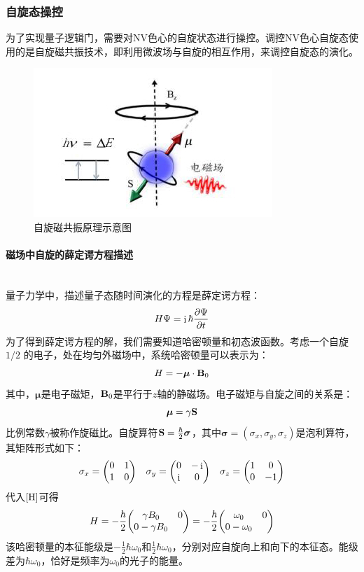 \documentclass[a4paper]{article}
\DeclareMathOperator{\I}{\mathrm{i}}
\begin{document}
\subsubsection{自旋态操控}
为了实现量子逻辑门，需要对NV色心的自旋状态进行操控。调控NV色心自旋态使用的是自旋磁共振技术，即利用微波场与自旋的相互作用，来调控自旋态的演化。
\begin{figure}[H]
	\centering
	\includegraphics[width=0.5\linewidth]{fig/spin.jpg}
	\caption{自旋磁共振原理示意图}
	\label{fig:spin}
\end{figure}

\paragraph{磁场中自旋的薛定谔方程描述}~\\
量子力学中，描述量子态随时间演化的方程是薛定谔方程：
\begin{equation}\label{Schr}
H\Psi = \I\hbar\pdv{\Psi}{t}
\end{equation}
为了得到薛定谔方程的解，我们需要知道哈密顿量和初态波函数。考虑一个自旋$ 1/2 $
的电子，处在均匀外磁场中，系统哈密顿量可以表示为：
\begin{equation}
H = -\bm\mu\cdot\vb{B}_0     \label{H}
\end{equation}
其中，$ \bm\mu $是电子磁矩，$ \vb{B}_0 $是平行于$ z  $轴的静磁场。电子磁矩与自旋之间的关系是：
\begin{equation}\label{key}
\bm\mu = \gamma\vb{S}
\end{equation}
比例常数$ \gamma $被称作旋磁比。自旋算符$ \vb{S} = \tfrac{\hbar}{2}\bm\sigma $，其中$ \bm\sigma =  (\sigma_x, \sigma_y, \sigma_z)  $是泡利算符，其矩阵形式如下：
\begin{align}
\sigma_x = \mqty(0 & 1\\ 1 & 0) && 
\sigma_y = \mqty(0 & -\I\\ \I & 0) &&
\sigma_z = \mqty(1 & 0\\ 0 & -1)
\end{align}
代入$ \eqref{H} $可得
\begin{equation}
\label{HH}
H = -\dfrac{\hbar}{2}\mqty(\gamma B_0 & 0\\ 0 -\gamma B_0) 
= -\dfrac{\hbar}{2}\mqty(\omega_0 & 0\\ 0 -\omega_0) 
\end{equation}
该哈密顿量的本征能级是$ -\tfrac{1}{2}\hbar\omega_0 $和$ \tfrac{1}{2}\hbar\omega_0 $，分别对应自旋向上和向下的本征态。能级
差为$ \hbar\omega_0 $，恰好是频率为$ \omega_0 $的光子的能量。
\end{document}
